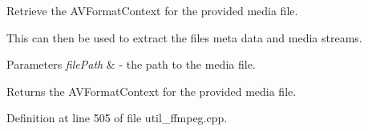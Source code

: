 Retrieve the AVFormatContext for the provided media file. 

This can then be used to extract the files meta data and media streams.


\begin{DoxyParams}{Parameters}
{\em filePath} & -\/ the path to the media file.\\
\hline
\end{DoxyParams}
\begin{DoxyReturn}{Returns}
the AVFormatContext for the provided media file. 
\end{DoxyReturn}


Definition at line 505 of file util\_\-ffmpeg.cpp.

